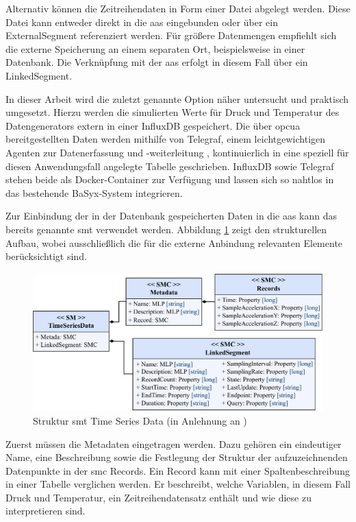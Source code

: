 Alternativ können die Zeitreihendaten in Form einer Datei abgelegt werden. 
Diese Datei kann entweder direkt in die \acs{aas} eingebunden oder über ein ExternalSegment referenziert werden.
Für größere Datenmengen empfiehlt sich die externe Speicherung an einem separaten Ort, beispielsweise in einer Datenbank.
Die Verknüpfung mit der \acs{aas} erfolgt in diesem Fall über ein LinkedSegment.

In dieser Arbeit wird die zuletzt genannte Option näher untersucht und praktisch umgesetzt.
Hierzu werden die simulierten Werte für Druck und Temperatur des Datengenerators extern in einer InfluxDB gespeichert.
Die über \acs{opcua} bereitgestellten Daten werden mithilfe von Telegraf, einem leichtgewichtigen Agenten zur Datenerfassung und -weiterleitung \cite{Influx}, kontinuierlich in eine speziell für diesen Anwendungsfall angelegte Tabelle geschrieben.
InfluxDB sowie Telegraf stehen beide als Docker-Container zur Verfügung und lassen sich so nahtlos in das bestehende BaSyx-System integrieren.

Zur Einbindung der in der Datenbank gespeicherten Daten in die \acs{aas} kann das bereits genannte \acs{smt} verwendet werden.
Abbildung \ref{fig:SMTTimeSeriesData} zeigt den strukturellen Aufbau, wobei ausschließlich die für die externe Anbindung relevanten Elemente berücksichtigt sind.

\begin{figure}[htbp]
    \centering
    \includegraphics[width=1\textwidth]{Bilder/TimeSeries/TimeSeriesData.pdf}
    \caption[Struktur \acs{smt} Time Series Data]{Struktur \acs{smt} Time Series Data (in Anlehnung an \cite{SpezifikationTimeSeriesData})}
    \label{fig:SMTTimeSeriesData}
\end{figure}

Zuerst müssen die Metadaten eingetragen werden. 
Dazu gehören ein eindeutiger Name, eine Beschreibung sowie die Festlegung der Struktur der aufzuzeichnenden Datenpunkte in der \acs{smc} Records.
Ein Record kann mit einer Spaltenbeschreibung in einer Tabelle verglichen werden.
Er beschreibt, welche Variablen, in diesem Fall Druck und Temperatur, ein Zeitreihendatensatz enthält und wie diese zu interpretieren sind.

